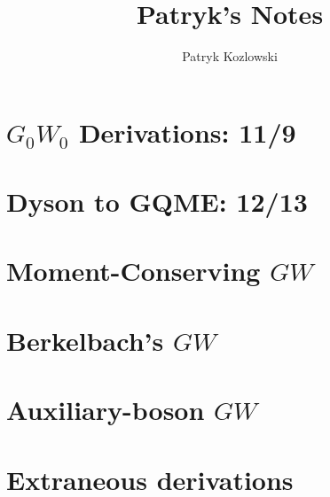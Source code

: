 \documentclass[12pt]{report}
\title{Patryk's Notes}
\author{Patryk Kozlowski}
\begin{document}
\setcounter{tocdepth}{3}  %
\tableofcontents
\clearpage  %

\maketitle

\chapter{$G_0W_0$ Derivations: 11/9}

\chapter{Dyson to GQME: 12/13}

\chapter{Moment-Conserving $GW$}

\chapter{Berkelbach's $GW$}

\chapter{Auxiliary-boson $GW$}




\chapter{Extraneous derivations}

\end{document}
